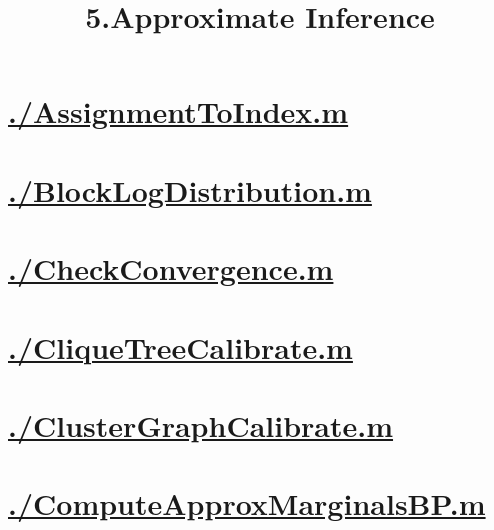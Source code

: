 \documentclass{article}
\title{5.Approximate Inference}
\begin{document}
\maketitle
\begin{multicols}{2}
  \label{toc}
  \tableofcontents
\end{multicols}
\newpage    \newpage
    \section{\hyperref[toc]{./AssignmentToIndex.m}}
        \newpage
    \section{\hyperref[toc]{./BlockLogDistribution.m}}
        \newpage
    \section{\hyperref[toc]{./CheckConvergence.m}}
        \newpage
    \section{\hyperref[toc]{./CliqueTreeCalibrate.m}}
        \newpage
    \section{\hyperref[toc]{./ClusterGraphCalibrate.m}}
        \newpage
    \section{\hyperref[toc]{./ComputeApproxMarginalsBP.m}}
        \newpage
\end{document}
